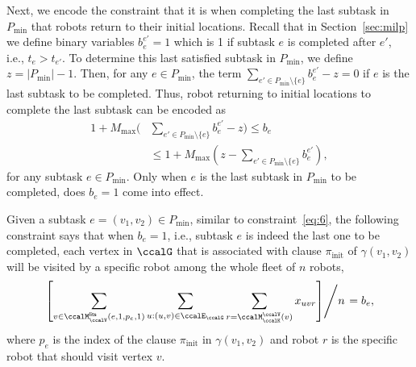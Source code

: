 \documentclass[Afour,sageh,times]{sagej}
\begin{document}
{{Next, we encode the constraint that it is when completing the last subtask in $P_{\text{min}}$ that robots return to their initial locations. Recall that in Section~\ref{sec:milp} we define binary variables $b_{e}^{e'}=1$ which is 1 if subtask $e$ is completed after  $e'$, i.e., $t_e >  t_{e'}$. To determine this last satisfied subtask in $P_{\text{min}}$,
  we define $z = |P_{\text{min}}| -1$. Then, for any $e \in P_{\text{min}}$, the term $\sum_{e' \in  P_{\text{min}}\setminus \{e \} } b_{e}^{e'} - z  = 0$ if $e$ is the last subtask to be completed. Thus, robot returning to initial locations to complete the last subtask  can be encoded as
\begin{align}\label{eq:lastsubtask}
  1 + M_{\text{max}} ( &  \sum_{e' \in  P_{\text{min}}\setminus \{e \} } b_{e}^{e'} - z)  \leq  b_e \nonumber \\
  & \leq 1 + M_{\text{max}} (z - \sum_{e' \in  P_{\text{min}}\setminus \{e \} } b_{e}^{e'}),
\end{align}
for any subtask $e \in P_{\text{min}}$. Only when $e$ is the last subtask in $P_{\text{min}}$ to be completed, does $b_e = 1$ come into effect.


Given a subtask $e = (v_1, v_2) \in P_{\text{min}}$, similar to constraint~\eqref{eq:6}, the following constraint says that when $b_e=1$, i.e., subtask $e$ is indeed the last one to be completed,  each vertex in $\ccalG$ that is associated with clause $\pi_{\text{init}}$ of $\gamma(v_1, v_2)$ will be visited by a specific robot among the whole fleet of $n$ robots,
\begin{align}\label{eq:return_suffix}
  \left.   \left[ \sum_{v \in \ccalM_\ccalV^\mathsf{lits}(e, 1, p_e, 1)}   \sum_{u: (u,v) \in \ccalE_\ccalG}     \sum_{r = \ccalM_{\ccalK}^\ccalV(v) }   x_{uvr} \right] \middle/ {n} \right. = b_e,
 \end{align}
where $p_e$ is the index of the clause $\pi_{\text{init}}$ in $\gamma(v_1, v_2)$ and robot $r$ is the specific robot that should visit vertex $v$.

}}
\end{document}
